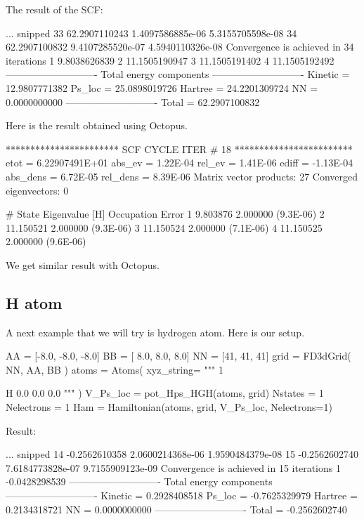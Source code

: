 The result of the SCF:
\begin{textcode}
... snipped
  33      62.2907110243   1.4097586885e-06   5.3155705598e-08
  34      62.2907100832   9.4107285520e-07   4.5940110326e-08
Convergence is achieved in 34 iterations
 1       9.8038626839
 2      11.1505190947
 3      11.1505191402
 4      11.1505192492
----------------------------
Total energy components
----------------------------
Kinetic =      12.9807771382
Ps_loc  =      25.0898019726
Hartree =      24.2201309724
NN      =       0.0000000000
----------------------------
Total   =      62.2907100832
\end{textcode}

Here is the result obtained using Octopus.
\begin{textcode}
 *********************** SCF CYCLE ITER #   18 ************************
 etot  =  6.22907491E+01 abs_ev   =  1.22E-04 rel_ev   =  1.41E-06
 ediff =       -1.13E-04 abs_dens =  6.72E-05 rel_dens =  8.39E-06
Matrix vector products:     27
Converged eigenvectors:      0

#  State  Eigenvalue [H]  Occupation    Error
      1        9.803876    2.000000   (9.3E-06)
      2       11.150521    2.000000   (9.3E-06)
      3       11.150524    2.000000   (7.1E-06)
      4       11.150525    2.000000   (9.6E-06) 
\end{textcode}

We get similar result with Octopus.



\subsection{H atom}

A next example that we will try is hydrogen atom. Here is our setup.
\begin{juliacode}
AA = [-8.0, -8.0, -8.0]
BB = [ 8.0,  8.0,  8.0]
NN = [41, 41, 41]
grid = FD3dGrid( NN, AA, BB )
atoms = Atoms( xyz_string=
  """
  1

  H  0.0  0.0  0.0
  """ )
V_Ps_loc = pot_Hps_HGH(atoms, grid)
Nstates = 1
Nelectrons = 1
Ham = Hamiltonian(atoms, grid, V_Ps_loc, Nelectrons=1)
\end{juliacode}

Result:
\begin{textcode}
... snipped
14      -0.2562610358   2.0600214368e-06   1.9590484379e-08
15      -0.2562602740   7.6184773828e-07   9.7155909123e-09
Convergence is achieved in 15 iterations
1      -0.0428298539
----------------------------
Total energy components
----------------------------
Kinetic =       0.2928408518
Ps_loc  =      -0.7625329979
Hartree =       0.2134318721
NN      =       0.0000000000
----------------------------
Total   =      -0.2562602740
\end{textcode}


